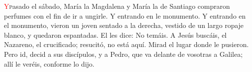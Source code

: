 \lettrine[lines=2]{\textcolor{red}{Y}} pasado el sábado, María la Magdalena y María la de Santiago compraron perfumes con el fin de ir a ungirle.
Y entrando en le monumento. Y entrando en el monumento, vieron un joven sentado a la derecha, vestido de un largo ropaje blanco, y quedaron
espantadas. El les dice: No temáis. A Jesús buscáis, el Nazareno, el crucificado; resucitó, no está aquí. Mirad el lugar donde le pusieron.
Pero id, decid a sus discípulos, y a Pedro, que va delante de vosotras a Galilea; allí le veréis, conforme lo dijo.